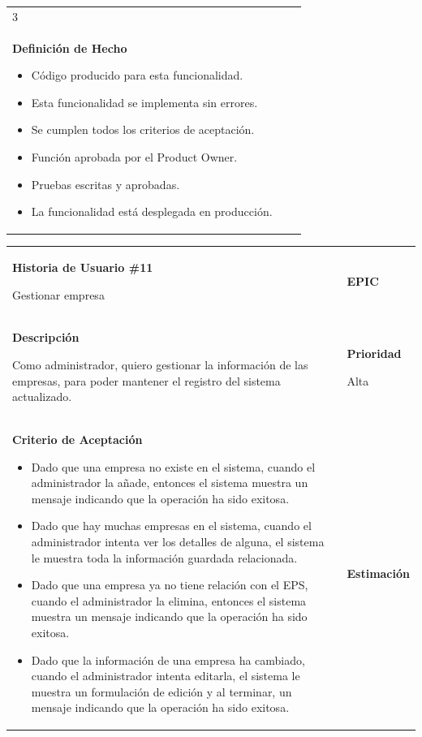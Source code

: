 \documentclass[12pt,a4paper]{article}
\begin{document}
\begin{center}
\begin{tabular}{| p{10cm} c p{2.5cm}|}
3 \\ 

\textbf{Definición de Hecho}

\begin{itemize}
\item Código producido para esta funcionalidad.
\item Esta funcionalidad se implementa sin errores.
\item Se cumplen todos los criterios de aceptación.
\item Función aprobada por el Product Owner.
\item Pruebas escritas y aprobadas.
\item La funcionalidad está desplegada en producción.
\end{itemize} & & \\
\hline  
\end{tabular}
\vspace{5mm}

\begin{tabular}{|>{\columncolor[RGB]{215, 215, 215}} p{10cm} >{\columncolor[RGB]{215, 215, 215}} c >{\columncolor[RGB]{215, 215, 215}} p{2.5cm}|}
\hline 
\textbf{Historia de Usuario \#11}

Gestionar empresa & & \textbf{{\Large EPIC}} \\ 
\textbf{Descripción}


Como administrador, quiero gestionar la información de las empresas,
para poder mantener el registro del sistema actualizado. &  & \textbf{Prioridad}

Alta\\

\textbf{Criterio de Aceptación}

\begin{itemize}
\item Dado que una empresa no existe en el sistema, cuando el
administrador la añade, entonces el sistema muestra un mensaje
indicando que la operación ha sido exitosa.
\item Dado que hay muchas empresas en el sistema, cuando el
administrador intenta ver los detalles de alguna, el sistema le
muestra toda la información guardada relacionada.
\item Dado que una empresa ya no tiene relación con el EPS, cuando el
administrador la elimina, entonces el sistema muestra un
mensaje indicando que la operación ha sido exitosa.
\item Dado que la información de una empresa ha cambiado, cuando
el administrador intenta editarla, el sistema le muestra un
formulación de edición y al terminar, un mensaje indicando que
la operación ha sido exitosa.
\end{itemize} & & \textbf{Estimación}


\end{tabular}
\end{center}
\end{document}
